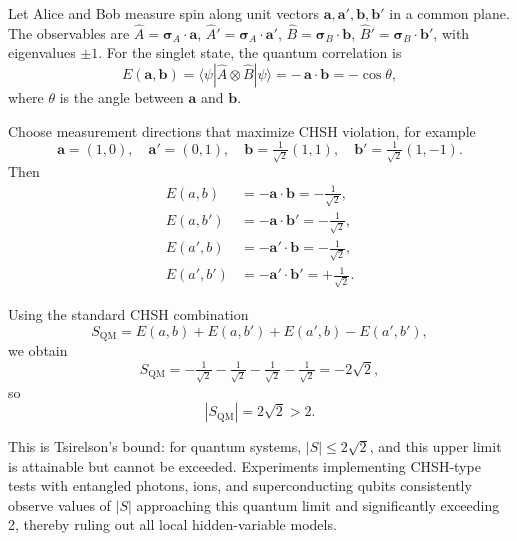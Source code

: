 \documentclass[11pt]{article}
\begin{document}
Let Alice and Bob measure spin along unit vectors $\mathbf{a}, \mathbf{a}', \mathbf{b}, \mathbf{b}'$ in a common plane. The observables are $\hat{A} = \boldsymbol{\sigma}_A\cdot\mathbf{a}$, $\hat{A}' = \boldsymbol{\sigma}_A\cdot\mathbf{a}'$, $\hat{B} = \boldsymbol{\sigma}_B\cdot\mathbf{b}$, $\hat{B}' = \boldsymbol{\sigma}_B\cdot\mathbf{b}'$, with eigenvalues $\pm 1$. For the singlet state, the quantum correlation is
\begin{equation}
E(\mathbf{a},\mathbf{b}) = \langle \psi | \hat{A}\otimes \hat{B} | \psi \rangle = -\,\mathbf{a}\cdot\mathbf{b} = -\cos\theta,
\end{equation}
where $\theta$ is the angle between $\mathbf{a}$ and $\mathbf{b}$.

Choose measurement directions that maximize CHSH violation, for example
\begin{equation}
\mathbf{a} = (1,0), \quad 
\mathbf{a}' = (0,1), \quad
\mathbf{b} = \tfrac{1}{\sqrt{2}}(1,1), \quad
\mathbf{b}' = \tfrac{1}{\sqrt{2}}(1,-1).
\end{equation}
Then
\begin{align}
E(a,b)   &= -\mathbf{a}\cdot\mathbf{b}   = -\tfrac{1}{\sqrt{2}},\\
E(a,b')  &= -\mathbf{a}\cdot\mathbf{b}'  = -\tfrac{1}{\sqrt{2}},\\
E(a',b)  &= -\mathbf{a}'\cdot\mathbf{b}  = -\tfrac{1}{\sqrt{2}},\\
E(a',b') &= -\mathbf{a}'\cdot\mathbf{b}' = +\tfrac{1}{\sqrt{2}}.
\end{align}

Using the standard CHSH combination
\begin{equation}
S_{\text{QM}} = E(a,b) + E(a,b') + E(a',b) - E(a',b'),
\end{equation}
we obtain
\begin{equation}
S_{\text{QM}} = -\tfrac{1}{\sqrt{2}} - \tfrac{1}{\sqrt{2}} - \tfrac{1}{\sqrt{2}} - \tfrac{1}{\sqrt{2}} = -2\sqrt{2},
\end{equation}
so
\begin{equation}
|S_{\text{QM}}| = 2\sqrt{2} > 2.
\end{equation}

This is Tsirelson's bound: for quantum systems, $|S| \le 2\sqrt{2}$, and this upper limit is attainable but cannot be exceeded. Experiments implementing CHSH-type tests with entangled photons, ions, and superconducting qubits consistently observe values of $|S|$ approaching this quantum limit and significantly exceeding 2, thereby ruling out all local hidden-variable models.
\end{document}
